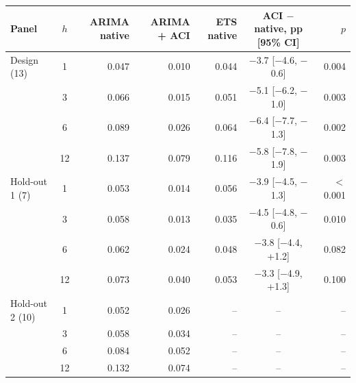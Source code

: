 \begin{tabular}{lcrrrcr}
\toprule
Panel & $h$ & ARIMA native & ARIMA + ACI & ETS native & ACI $-$ native, pp [95\% CI] & $p$ \\
\midrule
Design (13) & 1 & 0.047 & 0.010 & 0.044 & $-$3.7 [$-$4.6, $-$0.6] & 0.004 \\
 & 3 & 0.066 & 0.015 & 0.051 & $-$5.1 [$-$6.2, $-$1.0] & 0.003 \\
 & 6 & 0.089 & 0.026 & 0.064 & $-$6.4 [$-$7.7, $-$1.3] & 0.002 \\
 & 12 & 0.137 & 0.079 & 0.116 & $-$5.8 [$-$7.8, $-$1.9] & 0.003 \\
\midrule
Hold-out 1 (7) & 1 & 0.053 & 0.014 & 0.056 & $-$3.9 [$-$4.5, $-$1.3] & $<$0.001 \\
 & 3 & 0.058 & 0.013 & 0.035 & $-$4.5 [$-$4.8, $-$0.6] & 0.010 \\
 & 6 & 0.062 & 0.024 & 0.048 & $-$3.8 [$-$4.4, +1.2] & 0.082 \\
 & 12 & 0.073 & 0.040 & 0.053 & $-$3.3 [$-$4.9, +1.3] & 0.100 \\
\midrule
Hold-out 2 (10) & 1 & 0.052 & 0.026 & -- & -- & -- \\
 & 3 & 0.058 & 0.034 & -- & -- & -- \\
 & 6 & 0.084 & 0.052 & -- & -- & -- \\
 & 12 & 0.132 & 0.074 & -- & -- & -- \\
\bottomrule
\end{tabular}
